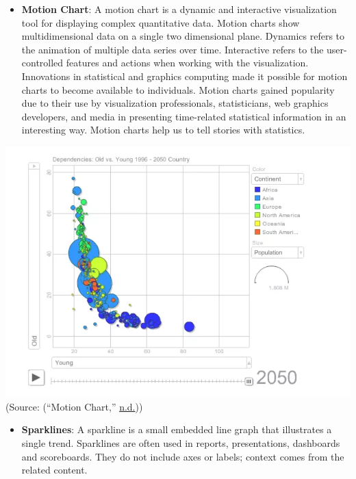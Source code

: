 \documentclass[]{book}
\providecommand{\tightlist}{%
  \setlength{\itemsep}{0pt}\setlength{\parskip}{0pt}}
\begin{document}
\begin{itemize}
\tightlist
\item
  \textbf{Motion Chart}: A motion chart is a dynamic and interactive visualization tool for displaying complex quantitative data. Motion charts show multidimensional data on a single two dimensional plane. Dynamics refers to the animation of multiple data series over time. Interactive refers to the user-controlled features and actions when working with the visualization. Innovations in statistical and graphics computing made it possible for motion charts to become available to individuals. Motion charts gained popularity due to their use by visualization professionals, statisticians, web graphics developers, and media in presenting time-related statistical information in an interesting way. Motion charts help us to tell stories with statistics.
\end{itemize}

\includegraphics{images/Image3.png}
(Source: (``Motion Chart,'' \protect\hyperlink{ref-motion_chart}{n.d.}))

\begin{itemize}
\tightlist
\item
  \textbf{Sparklines}: A sparkline is a small embedded line graph that illustrates a single trend. Sparklines are often used in reports, presentations, dashboards and scoreboards. They do not include axes or labels; context comes from the related content.
\end{itemize}
\end{document}
